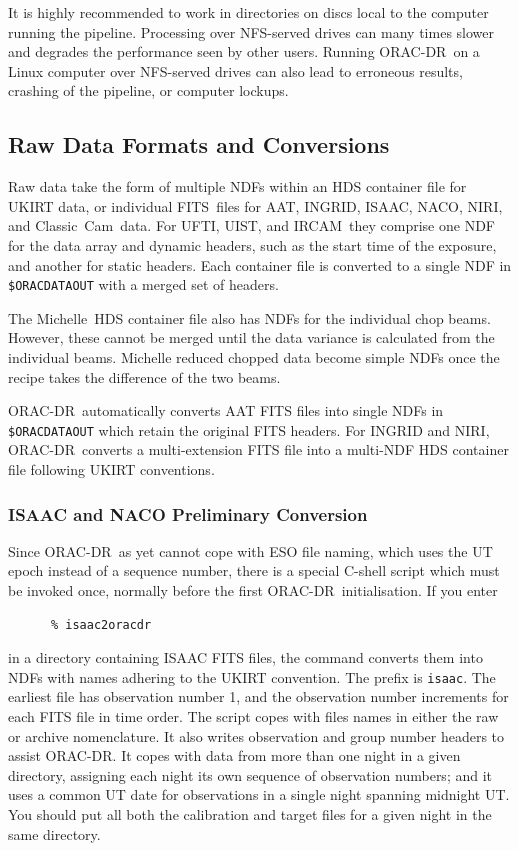 \documentclass[twoside,11pt]{article}
\newcommand{\htmladdnormallink}[2]{#1}
\newcommand{\xref}[3]{#1}
\newcommand{\xlabel}[1]{}
\renewcommand{\_}{\texttt{\symbol{95}}}
\newcommand{\ORACDR}{{\footnotesize ORAC-DR}}
\newcommand{\FITSref}{\htmladdnormallink{FITS}{http://fits.gsfc.nasa.gov/}}
\newcommand{\AAT}{\htmladdnormallink{AAT}{http://www.aao.gov.au/}}
\newcommand{\ClassicCam}{\htmladdnormallink{Classic~Cam}{http://www.ociw.edu/lco/magellan/instruments/Classic_Cam/}}
\newcommand{\INGRID}{\htmladdnormallink{INGRID}{http://www.ing.iac.es/Astronomy/instruments/ingrid/}}
\newcommand{\IRCAM}{\htmladdnormallink{IRCAM}{http://www.jach.hawaii.edu/JACpublic/UKIRT/instruments/ircam/ircam3.html}}
\newcommand{\ISAAC}{\htmladdnormallink{ISAAC}{http://www.eso.org/instruments/isaac/}}
\newcommand{\Michelle}{\htmladdnormallink{Michelle}{http://www.jach.hawaii.edu/JACpublic/UKIRT/instruments/michelle/michelle.html}}
\newcommand{\NACO}{\htmladdnormallink{NACO}{http://www.eso.org/instruments/naco/}}
\newcommand{\NIRI}{\htmladdnormallink{NIRI}{http://www.gemini.edu/sciops/instruments/niri/}}
\newcommand{\UIST}{\htmladdnormallink{UIST}{http://www.jach.hawaii.edu/JACpublic/UKIRT/instruments/uist/uist.html}}
\newcommand{\UFTI}{\htmladdnormallink{UFTI}{http://www.jach.hawaii.edu/JACpublic/UKIRT/instruments/ufti/ufti.html}}
\begin{document}
It is highly recommended to work in directories on discs local to
the computer running the pipeline.  Processing over NFS-served drives
can many times slower and degrades the performance seen by other users.
Running \ORACDR\ on a Linux computer over NFS-served drives can also
lead to erroneous results, crashing of the pipeline, or computer lockups.

\subsection{\xlabel{raw_data_formats_and_conversions}Raw Data Formats
and Conversions\label{raw_data_formats_and_conversions}}

Raw data take the form of multiple NDFs within an
\xref{HDS container file}{sun92}{} for UKIRT data, or individual
\FITSref\ files for \AAT, \INGRID, \ISAAC, \NACO, \NIRI, and \ClassicCam\ data.
For \UFTI, \UIST, and \IRCAM\ they comprise one NDF for the data array
and dynamic headers, such as the start time of the exposure, and
another for static headers.  Each container file is converted to a
single NDF in {\tt \$ORAC\_DATA\_OUT} with a merged set of headers.

The \Michelle\ HDS container file also has NDFs for the individual chop
beams.  However, these cannot be merged until the data variance is
calculated from the individual beams.  Michelle reduced chopped data
become simple NDFs once the recipe takes the difference of the two
beams.

\ORACDR\ automatically converts AAT FITS files into single NDFs in
{\tt \$ORAC\_DATA\_OUT} which retain the original FITS headers. For
INGRID and NIRI, \ORACDR\ converts a multi-extension FITS file into a
multi-NDF HDS container file following UKIRT conventions.

\subsubsection{\xlabel{isaac_and_naco_preliminary_conversion}ISAAC and NACO Preliminary
Conversion\label{isaac_and_naco_preliminary_conversion}}

Since \ORACDR\ as yet cannot cope with ESO file naming, which uses
the UT epoch instead of a sequence number, there is a special C-shell
script which must be invoked once, normally before the first \ORACDR\
initialisation.  If you enter

\begin{verbatim}
      % isaac2oracdr
\end{verbatim}
in a directory containing ISAAC FITS files, the command converts them
into NDFs with names adhering to the UKIRT convention.  The prefix
is {\tt isaac}.  The earliest file has observation number 1, and the
observation number increments for each FITS file in time order.  The
script copes with files names in either the raw or archive nomenclature.
It also writes observation and group number headers to assist ORAC-DR. 
It copes with data from more than one night in a given directory,
assigning each night its own sequence of observation numbers; and it
uses a common UT date for observations in a single night spanning
midnight UT.  You should put all both the calibration and target files
for a given night in the same directory.
\end{document}
